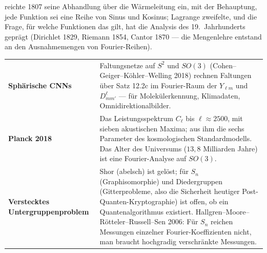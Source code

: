 \begin{geschichte}
 reichte 1807 seine Abhandlung über die Wärmeleitung ein, mit der Behauptung, jede Funktion sei eine Reihe von Sinus und Kosinus; Lagrange zweifelte, und die Frage, für welche Funktionen das gilt, hat die Analysis des 19.\ Jahrhunderts geprägt (Dirichlet 1829, Riemann 1854, Cantor 1870 --- die Mengenlehre entstand an den Ausnahmemengen von Fourier-Reihen).

\begin{center}
\begin{minipage}{0.9\textwidth}
\end{minipage}
\end{center}
\end{geschichte}

\begin{forschung}
\begin{center}
{\small
\renewcommand{\arraystretch}{1.45}
\begin{tabular}{@{}P{3.0cm}P{5.2cm}@{}}
\toprule
\textbf{Sphärische CNNs} & Faltungsnetze auf $S^{2}$ und $SO(3)$ (Cohen--Geiger--Köhler--Welling 2018) rechnen Faltungen über Satz 12.2c im Fourier-Raum der $Y_{\ell m}$ und $D^{\ell}_{mm'}$ --- für Molekülerkennung, Klimadaten, Omnidirektionalbilder.\\
\textbf{Planck 2018} & Das Leistungsspektrum $C_\ell$ bis $\ell\approx2500$, mit sieben akustischen Maxima; aus ihm die sechs Parameter des kosmologischen Standardmodells. Das Alter des Universums ($13{,}8$ Milliarden Jahre) ist eine Fourier-Analyse auf $SO(3)$.\\
\textbf{Verstecktes Untergruppenproblem} & Shor (abelsch) ist gelöst; für $S_n$ (Graphisomorphie) und Diedergruppen (Gitterprobleme, also die Sicherheit heutiger Post-Quanten-Kryptographie) ist offen, ob ein Quantenalgorithmus existiert. Hallgren--Moore--Rötteler--Russell--Sen 2006: Für $S_n$ reichen Messungen einzelner Fourier-Koeffizienten nicht, man braucht hochgradig verschränkte Messungen.\\
\bottomrule
\end{tabular}}
\end{center}
\end{forschung}

